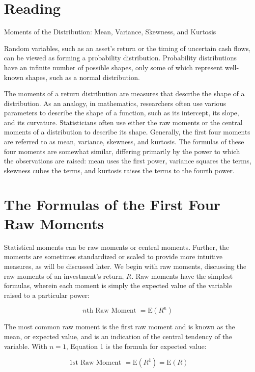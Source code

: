 \documentclass[11pt]{article}
\begin{document}
\section*{Reading}
Moments of the Distribution: Mean, Variance, Skewness, and Kurtosis

Random variables, such as an asset's return or the timing of uncertain cash flows, can be viewed as forming a probability distribution. Probability distributions have an infinite number of possible shapes, only some of which represent well-known shapes, such as a normal distribution.

The moments of a return distribution are measures that describe the shape of a distribution. As an analogy, in mathematics, researchers often use various parameters to describe the shape of a function, such as its intercept, its slope, and its curvature. Statisticians often use either the raw moments or the central moments of a distribution to describe its shape. Generally, the first four moments are referred to as mean, variance, skewness, and kurtosis. The formulas of these four moments are somewhat similar, differing primarily by the power to which the observations are raised: mean uses the first power, variance squares the terms, skewness cubes the terms, and kurtosis raises the terms to the fourth power.

\section*{The Formulas of the First Four Raw Moments}
Statistical moments can be raw moments or central moments. Further, the moments are sometimes standardized or scaled to provide more intuitive measures, as will be discussed later. We begin with raw moments, discussing the raw moments of an investment's return, $R$. Raw moments have the simplest formulas, wherein each moment is simply the expected value of the variable raised to a particular power:


\begin{equation*}
n \text {th Raw Moment }=\mathrm{E}\left(R^{n}\right) \tag{1}
\end{equation*}


The most common raw moment is the first raw moment and is known as the mean, or expected value, and is an indication of the central tendency of the variable. With $n=1$, Equation 1 is the formula for expected value:


\begin{equation*}
\text { 1st Raw Moment }=\mathrm{E}\left(R^{1}\right)=\mathrm{E}(R) \tag{2}
\end{equation*}
\end{document}
